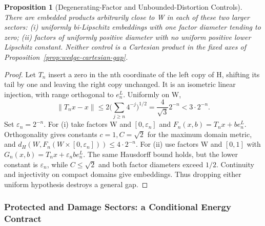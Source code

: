 \documentclass[11pt,a4paper]{article}
\theoremstyle{plain}
\newtheorem{proposition}[theorem]{Proposition}
\theoremstyle{definition}
\theoremstyle{remark}
\begin{document}
\begin{proposition}[Degenerating-Factor and Unbounded-Distortion Controls]
\label{prop:wedge-degenerate-controls}
There are embedded products arbitrarily close to W in each of these two
larger sectors: (i) uniformly bi-Lipschitz embeddings with one factor diameter
tending to zero; (ii) factors of uniformly positive diameter with no uniform
positive lower Lipschitz constant. Neither control is a Cartesian product
in the fixed axes of Proposition~\ref{prop:wedge-cartesian-gap}.
\end{proposition}
\begin{proof}
Let $T_n$ insert a zero in the nth coordinate of the left copy of H, shifting
its tail by one and leaving the right copy unchanged. It is an isometric
linear injection, with range orthogonal to $e_n^L$. Uniformly on W,
\[
 \|T_nx-x\|\le2\Big(\sum_{j\ge n}4^{-j}\Big)^{1/2}
 =\frac4{\sqrt3}2^{-n}<3\cdot2^{-n}.
\]
Set $\varepsilon_n=2^{-n}$. For (i) take factors W and
$[0,\varepsilon_n]$ and $F_n(x,b)=T_nx+be_n^L$.
Orthogonality gives constants $c=1,C=\sqrt2$ for the maximum domain metric,
and $d_H(W,F_n(W\times[0,\varepsilon_n]))\le4\cdot2^{-n}$.
For (ii) use factors W and $[0,1]$ with
$G_n(x,b)=T_nx+\varepsilon_nbe_n^L$. The same Hausdorff bound holds, but
the lower constant is $\varepsilon_n$, while $C\le\sqrt2$ and both factor
diameters exceed $1/2$. Continuity and injectivity on compact domains give
embeddings. Thus dropping either uniform hypothesis destroys a general gap.
\end{proof}

\subsubsection{Protected and Damage Sectors: a Conditional Energy Contract}
\end{document}
